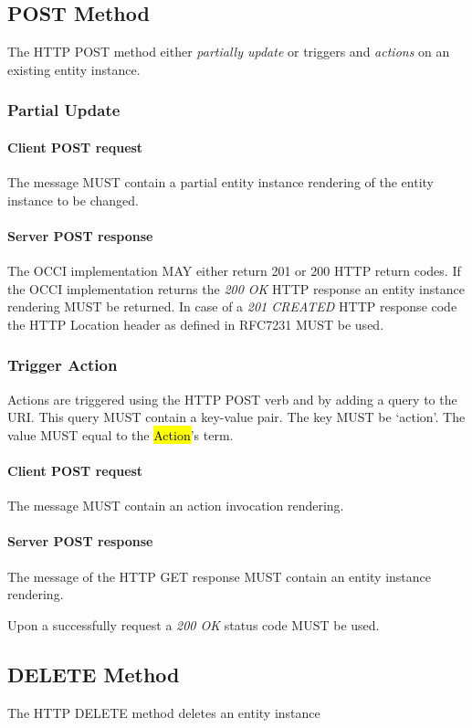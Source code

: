 \documentclass[10pt,a4paper]{article}
\begin{document}
\subsection{POST Method}
The HTTP POST method either {\em partially update} or triggers and {\em actions} on an existing entity instance.

\subsubsection{Partial Update}

\paragraph{Client POST request}
The message MUST contain a partial entity instance rendering of the entity instance to be changed.

\paragraph{Server POST response}
The OCCI implementation MAY either return 201 or 200 HTTP return codes. If the OCCI implementation
returns the \emph{200 OK} HTTP response an entity instance rendering MUST be returned.
In case of a \emph{201 CREATED} HTTP response code the HTTP Location header as defined in RFC7231 \cite{rfc7231} MUST be used.

\subsubsection{Trigger Action}
Actions are triggered using the HTTP POST verb and by adding a query to the URI. This query MUST contain a key-value pair. The key MUST be `action'. The value MUST equal to the \hl{Action}'s term.

\paragraph{Client POST request}
The message MUST contain an action invocation rendering.

\paragraph{Server POST response}
The message of the HTTP GET response MUST contain an entity instance rendering.

Upon a successfully request a \emph{200 OK} status code MUST be used.

\subsection{DELETE Method}
The HTTP DELETE method deletes an entity instance
\end{document}
